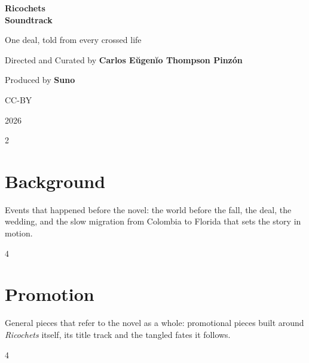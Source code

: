 \documentclass[a4paper,landscape]{memoir}
\begin{document}
\frontmatter
{}

\begin{titlingpage}
\centering
\vspace*{\fill}
{\LARGE\bfseries Ricochets\\\Huge Soundtrack\par}
\bigskip
{\large One deal, told from every crossed life\par}
\vspace*{\fill}
{\normalsize Directed and Curated by \bfseries Carlos Eŭgenĭo Thompson Pinzón\par}
{\normalsize Produced by \bfseries Suno\par}
\bigskip
{\normalsize CC-BY\par}
{\normalsize 2026\par}
\vspace*{\fill}
\end{titlingpage}

\clearpage\begin{multicols*}{2}
\tableofcontents*
\end{multicols*}
\mainmatter
\renewcommand\chaptername{Album~}

\chapter{Background}
Events that happened before the novel: the world before the fall, the deal, the wedding, and the slow migration from Colombia to Florida that sets the story in motion.
\clearpage\begin{multicols*}{4}








\end{multicols*}

\chapter{Promotion}
General pieces that refer to the novel as a whole: promotional pieces built around \emph{Ricochets} itself, its title track and the tangled fates it follows.
\clearpage\begin{multicols*}{4}



\end{multicols*}
\end{document}
